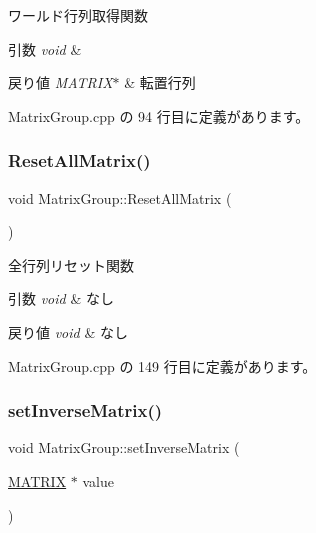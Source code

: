 ワールド行列取得関数 


\begin{DoxyParams}{引数}
{\em void} & \\
\hline
\end{DoxyParams}

\begin{DoxyRetVals}{戻り値}
{\em M\+A\+T\+R\+I\+X$\ast$} & 転置行列 \\
\hline
\end{DoxyRetVals}


 Matrix\+Group.\+cpp の 94 行目に定義があります。

\mbox{\label{class_matrix_group_ace011440a1a9367bf60571d8db482ee7}} 
\subsubsection{\texorpdfstring{Reset\+All\+Matrix()}{ResetAllMatrix()}}
{\footnotesize\ttfamily void Matrix\+Group\+::\+Reset\+All\+Matrix (\begin{DoxyParamCaption}{ }\end{DoxyParamCaption})\hspace{0.3cm}{\ttfamily [private]}}



全行列リセット関数 


\begin{DoxyParams}{引数}
{\em void} & なし \\
\hline
\end{DoxyParams}

\begin{DoxyRetVals}{戻り値}
{\em void} & なし \\
\hline
\end{DoxyRetVals}


 Matrix\+Group.\+cpp の 149 行目に定義があります。

\mbox{\label{class_matrix_group_ab503242a596d4cbf5952386a588a95c1}} 
\subsubsection{\texorpdfstring{set\+Inverse\+Matrix()}{setInverseMatrix()}}
{\footnotesize\ttfamily void Matrix\+Group\+::set\+Inverse\+Matrix (\begin{DoxyParamCaption}\item[{\mbox{\hyperlink{_matrix_8h_a032295cd9fb1b711757c90667278e744}{M\+A\+T\+R\+IX}} $\ast$}]{value }\end{DoxyParamCaption})}



